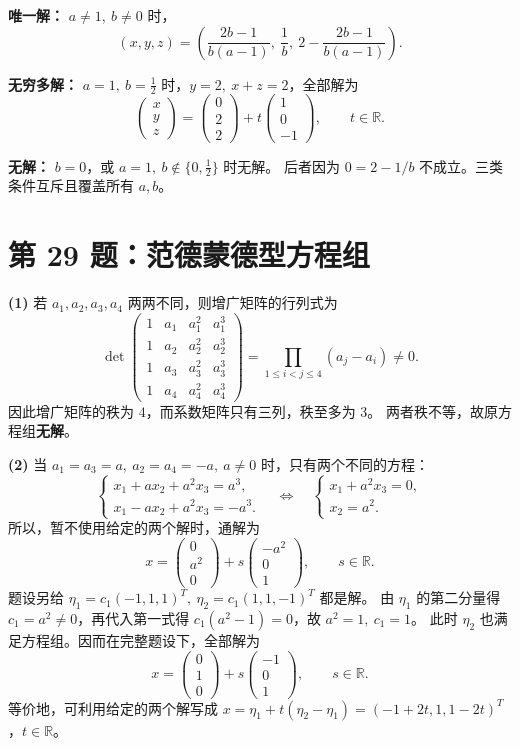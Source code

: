 \documentclass[11pt,a4paper,fontset=fandol]{ctexart}
\newcommand{\problem}[1]{\Needspace{6\baselineskip}\section*{#1}}
\newcommand{\ans}[1]{\boxed{#1}}
\newcommand{\R}{\mathbb R}
\begin{document}
\textbf{唯一解：} $a\ne1,\ b\ne0$ 时，
\[
\ans{(x,y,z)=\left(\frac{2b-1}{b(a-1)},\ \frac1b,\
2-\frac{2b-1}{b(a-1)}\right).}
\]

\textbf{无穷多解：} $a=1,\ b=\tfrac12$ 时，$y=2,\ x+z=2$，全部解为
\[
\ans{\begin{pmatrix}x\\y\\z\end{pmatrix}
=\begin{pmatrix}0\\2\\2\end{pmatrix}
+t\begin{pmatrix}1\\0\\-1\end{pmatrix},\qquad t\in\R.}
\]

\textbf{无解：} $b=0$，或 $a=1,\ b\notin\{0,\tfrac12\}$ 时无解。
后者因为 $0=2-1/b$ 不成立。三类条件互斥且覆盖所有 $a,b$。

\problem{第 29 题：范德蒙德型方程组}
\textbf{(1)} 若 $a_1,a_2,a_3,a_4$ 两两不同，则增广矩阵的行列式为
\[
\det\begin{pmatrix}
1&a_1&a_1^2&a_1^3\\
1&a_2&a_2^2&a_2^3\\
1&a_3&a_3^2&a_3^3\\
1&a_4&a_4^2&a_4^3
\end{pmatrix}
=\prod_{1\le i<j\le4}(a_j-a_i)\ne0.
\]
因此增广矩阵的秩为 $4$，而系数矩阵只有三列，秩至多为 $3$。
两者秩不等，故原方程组\textbf{无解}。

\textbf{(2)} 当 $a_1=a_3=a,\ a_2=a_4=-a,\ a\ne0$ 时，只有两个不同的方程：
\[
\begin{cases}x_1+ax_2+a^2x_3=a^3,\\x_1-ax_2+a^2x_3=-a^3.\end{cases}
\quad\Longleftrightarrow\quad
\begin{cases}x_1+a^2x_3=0,\\x_2=a^2.\end{cases}
\]
所以，暂不使用给定的两个解时，通解为
\[
x=\begin{pmatrix}0\\a^2\\0\end{pmatrix}
+s\begin{pmatrix}-a^2\\0\\1\end{pmatrix},\qquad s\in\R.
\]
题设另给 $\eta_1=c_1(-1,1,1)^T,\ \eta_2=c_1(1,1,-1)^T$ 都是解。
由 $\eta_1$ 的第二分量得 $c_1=a^2\ne0$，再代入第一式得
$c_1(a^2-1)=0$，故 $a^2=1,\ c_1=1$。
此时 $\eta_2$ 也满足方程组。因而在完整题设下，全部解为
\[
\ans{x=\begin{pmatrix}0\\1\\0\end{pmatrix}
+s\begin{pmatrix}-1\\0\\1\end{pmatrix},\qquad s\in\R.}
\]
等价地，可利用给定的两个解写成
$x=\eta_1+t(\eta_2-\eta_1)=(-1+2t,1,1-2t)^T$，$t\in\R$。
\end{document}

